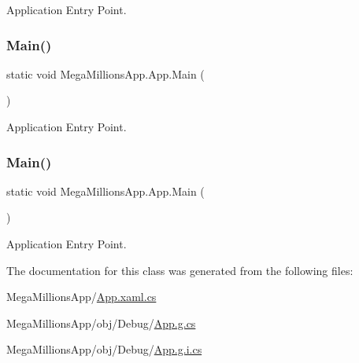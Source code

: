 Application Entry Point. 

\mbox{\label{class_mega_millions_app_1_1_app_ad607c36bf99b435ebd504f88da320cb6}} 
\subsubsection{\texorpdfstring{Main()}{Main()}\hspace{0.1cm}{\footnotesize\ttfamily [3/4]}}
{\footnotesize\ttfamily static void Mega\+Millions\+App.\+App.\+Main (\begin{DoxyParamCaption}{ }\end{DoxyParamCaption})\hspace{0.3cm}{\ttfamily [static]}}



Application Entry Point. 

\mbox{\label{class_mega_millions_app_1_1_app_ad607c36bf99b435ebd504f88da320cb6}} 
\subsubsection{\texorpdfstring{Main()}{Main()}\hspace{0.1cm}{\footnotesize\ttfamily [4/4]}}
{\footnotesize\ttfamily static void Mega\+Millions\+App.\+App.\+Main (\begin{DoxyParamCaption}{ }\end{DoxyParamCaption})\hspace{0.3cm}{\ttfamily [static]}}



Application Entry Point. 



The documentation for this class was generated from the following files\+:\begin{DoxyCompactItemize}
\item 
Mega\+Millions\+App/\hyperlink{_app_8xaml_8cs}{App.\+xaml.\+cs}\item 
Mega\+Millions\+App/obj/\+Debug/\hyperlink{_debug_2_app_8g_8cs}{App.\+g.\+cs}\item 
Mega\+Millions\+App/obj/\+Debug/\hyperlink{_debug_2_app_8g_8i_8cs}{App.\+g.\+i.\+cs}\end{DoxyCompactItemize}
